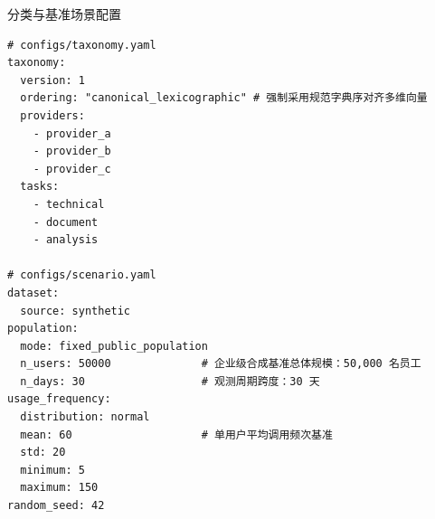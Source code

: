 \begin{techbox}{分类与基准场景配置}
\begin{verbatim}
# configs/taxonomy.yaml
taxonomy:
  version: 1
  ordering: "canonical_lexicographic" # 强制采用规范字典序对齐多维向量
  providers:
    - provider_a
    - provider_b
    - provider_c
  tasks:
    - technical
    - document
    - analysis

# configs/scenario.yaml
dataset:
  source: synthetic
population:
  mode: fixed_public_population
  n_users: 50000              # 企业级合成基准总体规模：50,000 名员工
  n_days: 30                  # 观测周期跨度：30 天
usage_frequency:
  distribution: normal
  mean: 60                    # 单用户平均调用频次基准
  std: 20
  minimum: 5
  maximum: 150
random_seed: 42
\end{verbatim}
\end{techbox}
